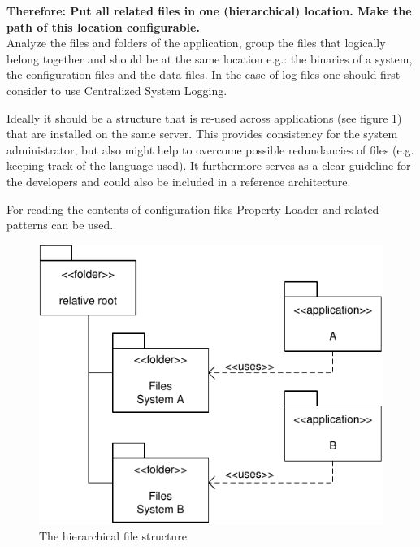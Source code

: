 \begin{center}
   
\end{center}

\textbf{Therefore: Put all related files in one (hierarchical) location. Make the path of this location configurable.}\\

Analyze the files and folders of the application, group the files that logically belong together and should be at the same location e.g.: the binaries of a system, the configuration files and the data files. In the case of log files one should first consider to use {\sc Centralized System Logging}.

Ideally it should be a structure that is re-used across applications (see figure \ref{fig:singleFileLocationDiagram-01}) that are installed on the same server. This provides consistency for the system administrator, but also might help to overcome possible redundancies of files (e.g. keeping track of the language used). It furthermore serves as a clear guideline for the developers and could also be included in a reference architecture.

For reading the contents of configuration files {\sc Property Loader} and related patterns \cite{Wellhausen2010} can be used. 

\begin{figure}[h]
\centering
\includegraphics{patterns/singleFileLocationDiagram-01.pdf}
\caption{The hierarchical file structure}
\label{fig:singleFileLocationDiagram-01}
\end{figure}

